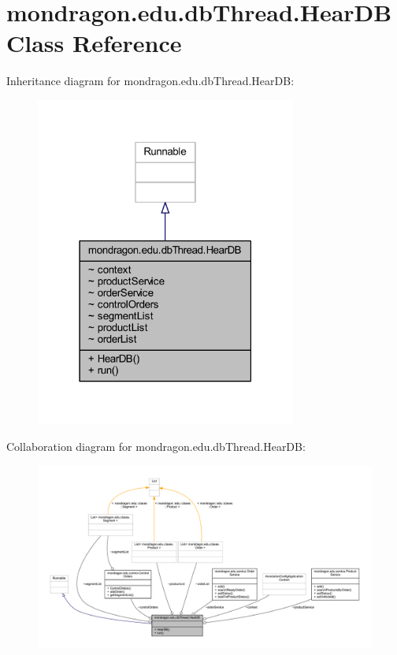 \hypertarget{classmondragon_1_1edu_1_1db_thread_1_1_hear_d_b}{}\section{mondragon.\+edu.\+db\+Thread.\+Hear\+DB Class Reference}
\label{classmondragon_1_1edu_1_1db_thread_1_1_hear_d_b}


Inheritance diagram for mondragon.\+edu.\+db\+Thread.\+Hear\+DB\+:\nopagebreak
\begin{figure}[H]
\begin{center}
\leavevmode
\includegraphics[width=243pt]{classmondragon_1_1edu_1_1db_thread_1_1_hear_d_b__inherit__graph}
\end{center}
\end{figure}


Collaboration diagram for mondragon.\+edu.\+db\+Thread.\+Hear\+DB\+:
\nopagebreak
\begin{figure}[H]
\begin{center}
\leavevmode
\includegraphics[width=350pt]{classmondragon_1_1edu_1_1db_thread_1_1_hear_d_b__coll__graph}
\end{center}
\end{figure}
